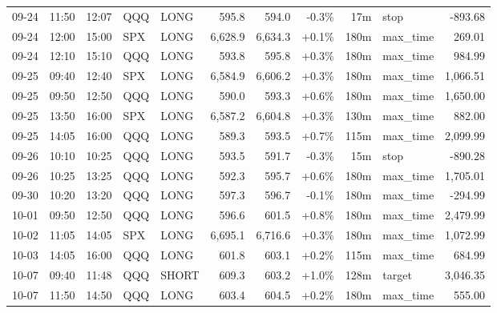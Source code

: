 \documentclass[11pt,a4paper,twoside]{article}
\begin{document}
\begin{center}
\begin{longtable}{>{\color{txtmain}}l l l l l r r r r >{\color{txtmain}}l r}
09-24 & 11:50 & 12:07 & QQQ & LONG & 595.8 & 594.0 & \textcolor{lossred}{-0.3\%} & 17m & stop & \textcolor{lossred}{-893.68} \\
09-24 & 12:00 & 15:00 & SPX & LONG & 6,628.9 & 6,634.3 & \textcolor{wingreen}{+0.1\%} & 180m & max\_time & \textcolor{wingreen}{269.01} \\
09-24 & 12:10 & 15:10 & QQQ & LONG & 593.8 & 595.8 & \textcolor{wingreen}{+0.3\%} & 180m & max\_time & \textcolor{wingreen}{984.99} \\
09-25 & 09:40 & 12:40 & SPX & LONG & 6,584.9 & 6,606.2 & \textcolor{wingreen}{+0.3\%} & 180m & max\_time & \textcolor{wingreen}{1,066.51} \\
09-25 & 09:50 & 12:50 & QQQ & LONG & 590.0 & 593.3 & \textcolor{wingreen}{+0.6\%} & 180m & max\_time & \textcolor{wingreen}{1,650.00} \\
09-25 & 13:50 & 16:00 & SPX & LONG & 6,587.2 & 6,604.8 & \textcolor{wingreen}{+0.3\%} & 130m & max\_time & \textcolor{wingreen}{882.00} \\
09-25 & 14:05 & 16:00 & QQQ & LONG & 589.3 & 593.5 & \textcolor{wingreen}{+0.7\%} & 115m & max\_time & \textcolor{wingreen}{2,099.99} \\
09-26 & 10:10 & 10:25 & QQQ & LONG & 593.5 & 591.7 & \textcolor{lossred}{-0.3\%} & 15m & stop & \textcolor{lossred}{-890.28} \\
09-26 & 10:25 & 13:25 & QQQ & LONG & 592.3 & 595.7 & \textcolor{wingreen}{+0.6\%} & 180m & max\_time & \textcolor{wingreen}{1,705.01} \\
09-30 & 10:20 & 13:20 & QQQ & LONG & 597.3 & 596.7 & \textcolor{lossred}{-0.1\%} & 180m & max\_time & \textcolor{lossred}{-294.99} \\
10-01 & 09:50 & 12:50 & QQQ & LONG & 596.6 & 601.5 & \textcolor{wingreen}{+0.8\%} & 180m & max\_time & \textcolor{wingreen}{2,479.99} \\
10-02 & 11:05 & 14:05 & SPX & LONG & 6,695.1 & 6,716.6 & \textcolor{wingreen}{+0.3\%} & 180m & max\_time & \textcolor{wingreen}{1,072.99} \\
10-03 & 14:05 & 16:00 & QQQ & LONG & 601.8 & 603.1 & \textcolor{wingreen}{+0.2\%} & 115m & max\_time & \textcolor{wingreen}{684.99} \\
10-07 & 09:40 & 11:48 & QQQ & SHORT & 609.3 & 603.2 & \textcolor{wingreen}{+1.0\%} & 128m & target & \textcolor{wingreen}{3,046.35} \\
10-07 & 11:50 & 14:50 & QQQ & LONG & 603.4 & 604.5 & \textcolor{wingreen}{+0.2\%} & 180m & max\_time & \textcolor{wingreen}{555.00} \\

\end{longtable}
\end{center}
\end{document}
